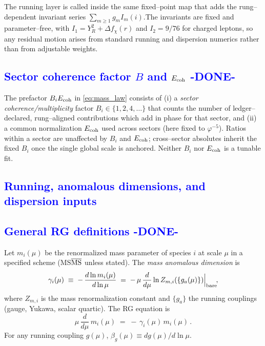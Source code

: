 \documentclass[%
 amsmath,amssymb,
 aps,
prb,
floatfix, showkeys
]{revtex4-2}
\newcommand{\modif}[1]{\textcolor{blue}{#1}}
\begin{document}
 The running layer is called inside the same fixed--point map that adds the rung--dependent invariant series $\sum_{m\ge1}g_m I_m(i)$.\;The invariants are fixed and parameter--free, with $I_1=Y_R^2+\Delta f_\chi(r)$ and $I_2=9/76$ for charged leptons, so any residual motion arises from standard running and dispersion numerics rather than from adjustable weights.





 
{\modif{
 \subsection{Sector coherence factor $B$ and $E_{\rm coh}$  -DONE-}
\label{subsec:sector-coherence}
}}
The prefactor $B_i E_{\rm coh}$ in \eqref{eq:mass_law} consists of (i) a
\emph{sector coherence/multiplicity} factor $B_i\in\{1,2,4,\dots\}$
that counts the number of ledger–declared, rung–aligned contributions which add in
phase for that sector, and (ii) a common normalization $E_{\rm coh}$ used across sectors
(here fixed to $\varphi^{-5}$).
Ratios within a sector are unaffected by $B_i$ and $E_{\rm coh}$; cross–sector absolutes
inherit the fixed $B_i$ once the single global scale is anchored.
Neither $B_i$ nor $E_{\rm coh}$ is a tunable fit.





{\modif{
    \section{Running, anomalous dimensions, and dispersion inputs}
\label{sec:running}
}}


{\modif{
\subsection{General RG definitions  -DONE-}    %
\label{subsec:rg_defs}
}}
Let $m_i(\mu)$ be the renormalized mass parameter of species $i$ at
scale $\mu$ in a specified scheme (MS$\overline{\rm MS}$ unless stated).
The \emph{mass anomalous dimension} is
\begin{equation}
  \gamma_i(\mu) \;\equiv\; -\,\frac{d\ln m_i(\mu)}{d\ln\mu}
  \;=\; -\,\mu\,\frac{d}{d\mu}\ln Z_{m,i}(\{g_a(\mu)\})\Big|_{\rm bare}\!,
  \label{eq:gamma_def}
\end{equation}
where $Z_{m,i}$ is the mass renormalization constant and $\{g_a\}$ the running couplings (gauge, Yukawa, scalar quartic). The RG equation is
\begin{equation}
  \mu\,\frac{d}{d\mu}\,m_i(\mu) \;=\; -\,\gamma_i(\mu)\,m_i(\mu)\,.
  \label{eq:RGE_mass}
\end{equation}
For any running coupling $g(\mu)$, $\beta_g(\mu)\equiv d g(\mu)/d\ln\mu$.
\end{document}
